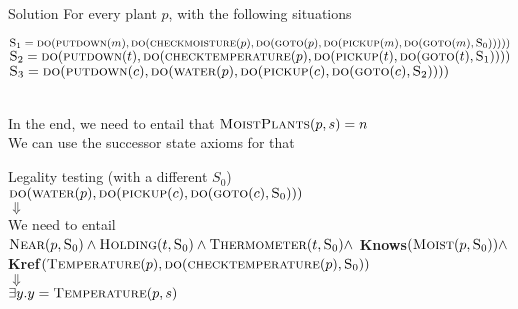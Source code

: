 \begin{frame}{Solution}
    For every plant $p$, with the following situations
    \hspace*{-1cm}
    \begin{minipage}{\linewidth}
        \vspace{5pt}
        $\textsc{S}_1 = \\ \textsc{do}(\textsc{putdown}(m),\textsc{do}(\textsc{checkmoisture}(p), \textsc{do}(\textsc{goto}(p),\textsc{do}(\textsc{pickup}(m),\textsc{do}(\textsc{goto}(m),\textsc{S}_0)))))$
        $\textsc{S}_2 = \\ \textsc{do}(\textsc{putdown}(t),\textsc{do}(\textsc{checktemperature}(p), \textsc{do}(\textsc{pickup}(t),\textsc{do}(\textsc{goto}(t),\textsc{S}_1))))$ 
        $\textsc{S}_3 = \\ \textsc{do}(\textsc{putdown}(c),\textsc{do}(\textsc{water}(p), \textsc{do}(\textsc{pickup}(c),\textsc{do}(\textsc{goto}(c),\textsc{S}_2))))$
    \end{minipage} \\
    \vspace{15pt}
    In the end, we need to entail that $\textsc{MoistPlants}(p, s) = n$ \\
    We can use the successor state axioms for that
\end{frame}

\begin{frame}{Legality testing (with a different $S_0$)}
    \centering
    $\textsc{do}(\textsc{water}(p), \textsc{do}(\textsc{pickup}(c),\textsc{do}(\textsc{goto}(c),\textsc{S}_0)))$ \\
    $\Downarrow$ \\
    We need to entail \\$\textsc{Near}(p,\textsc{S}_0) \land \textsc{Holding}(t,\textsc{S}_0) \land 
    \textsc{Thermometer}(t,\textsc{S}_0) \land$ \textbf{Knows}$(\textsc{Moist}(p,\textsc{S}_0)) \land$ \textbf{Kref}$(\textsc{Temperature}(p),\textsc{do}(\textsc{checktemperature}(p),\textsc{S}_0))$ \\
    $\Downarrow$ \\
    $\exists y.y = \textsc{Temperature}(p,s)$

    

\end{frame}

